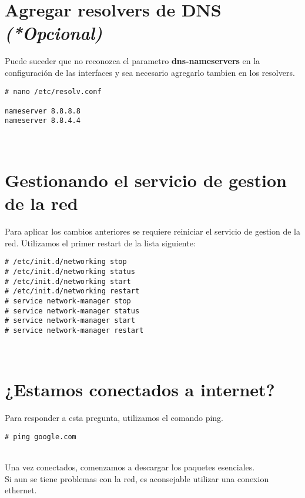 \section{Agregar resolvers de DNS \emph{(*Opcional)}}
Puede suceder que no reconozca el parametro \textbf{dns-nameservers} en la configuración de las interfaces y sea necesario agregarlo tambien en los resolvers.
\begin{verbatim}
# nano /etc/resolv.conf

nameserver 8.8.8.8
nameserver 8.8.4.4
\end{verbatim}
\\[1em]

\section{Gestionando el servicio de gestion de la red}
Para aplicar los cambios anteriores se requiere reiniciar el servicio de gestion de la red. Utilizamos el primer restart de la lista siguiente:
\begin{verbatim}
# /etc/init.d/networking stop
# /etc/init.d/networking status
# /etc/init.d/networking start
# /etc/init.d/networking restart
# service network-manager stop
# service network-manager status
# service network-manager start
# service network-manager restart
\end{verbatim}
\\[1em]

\section{¿Estamos conectados a internet?}
Para responder a esta pregunta, utilizamos el comando ping.
\begin{verbatim}
# ping google.com
\end{verbatim}
\\[1em]
Una vez conectados, comenzamos a descargar los paquetes esenciales.\\
Si aun se tiene problemas con la red, es aconsejable utilizar una conexion ethernet.\\


